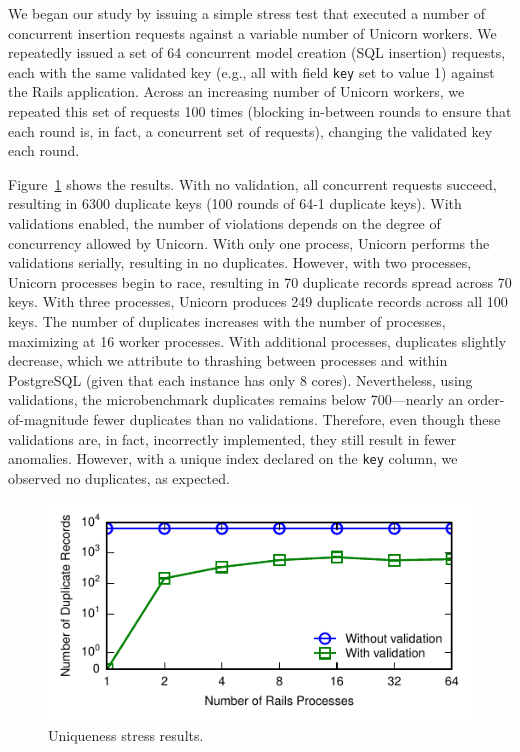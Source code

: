 We began our study by issuing a simple stress test that executed a
number of concurrent insertion requests against a variable number of
Unicorn workers. We repeatedly issued a set of 64 concurrent model
creation (SQL insertion) requests, each with the same validated key
(e.g., all with field \texttt{key} set to value 1) against the Rails
application. Across an increasing number of Unicorn workers, we
repeated this set of requests 100 times (blocking in-between rounds to
ensure that each round is, in fact, a concurrent set of requests),
changing the validated key each round.

Figure~\ref{fig:pk-stress} shows the results. With no validation, all
concurrent requests succeed, resulting in 6300 duplicate keys (100
rounds of 64-1 duplicate keys). With validations enabled, the number
of violations depends on the degree of concurrency allowed by
Unicorn. With only one process, Unicorn performs the validations
serially, resulting in no duplicates. However, with two processes,
Unicorn processes begin to race, resulting in 70 duplicate records
spread across 70 keys. With three processes, Unicorn produces 249
duplicate records across all 100 keys. The number of duplicates
increases with the number of processes, maximizing at 16 worker
processes. With additional processes, duplicates slightly decrease,
which we attribute to thrashing between processes and within
PostgreSQL (given that each instance has only 8 cores). Nevertheless,
using validations, the microbenchmark duplicates remains below
700---nearly an order-of-magnitude fewer duplicates than no
validations. Therefore, even though these validations are, in fact,
incorrectly implemented, they still result in fewer
anomalies. However, with a unique index declared on the \texttt{key}
column, we observed no duplicates, as expected.

\begin{figure}
\includegraphics[width=\columnwidth]{figs/pk_stress_violations.pdf}
\caption{Uniqueness stress results.}
\label{fig:pk-stress}
\end{figure} 

